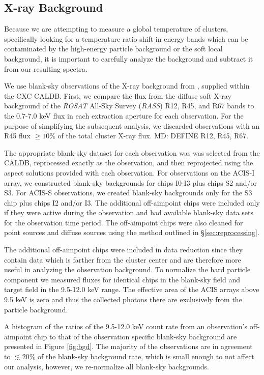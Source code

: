 \documentclass{emulateapj}
\begin{document}
\subsection{X-ray Background} \label{sec:background}

Because we are attempting to measure a global temperature of clusters,
specifically looking for a temperature ratio shift in energy bands
which can be contaminated by the high-energy particle
background or the soft local background, it is important to carefully
analyze the background and subtract it from our resulting spectra.

We use 
blank-sky observations of the X-ray background from
\cite{2001ApJ...562L.153M}, supplied within the CXC CALDB. 
First, we compare the flux from the diffuse soft X-ray
background of the {\textit{ROSAT}} All-Sky
Survey ({\textit{RASS}}) R12, R45, and R67 bands to the 0.7-7.0 keV flux in
each extraction aperture for each observation. For the purpose
of simplifying the subsequent analysis, we discarded observations with
an R45 flux $\geq 10\%$ of the total cluster X-ray flux. 
MD: DEFINE R12, R45, R67.

The appropriate blank-sky dataset for each observation was was
selected from the CALDB, reprocessed exactly as the
observation, and then reprojected using the aspect solutions provided
with each observation. For observations on the ACIS-I array, we
constructed blank-sky backgrounds for chips I0-I3 plus chips S2 and/or S3.
For ACIS-S observations, we created blank-sky backgrounds only for the S3
chip plus chips I2 and/or I3. The additional off-aimpoint chips were
included only if they were active during the observation and had
available blank-sky data sets for the observation time period. The
off-aimpoint chips were also cleaned for point sources and diffuse
sources using the method outlined in \S\ref{sec:reprocessing}.

The additional off-aimpoint chips were included in data reduction since
they contain data which is farther from the cluster center and are therefore
more useful in analyzing the observation background. To normalize the
hard particle component we measured fluxes for identical chips
in the blank-sky field and target field in the 9.5-12.0 keV
range. The effective area of the ACIS
arrays above 9.5 keV is zero and thus the collected photons there are
exclusively from the particle background.

A histogram of the ratios of the 9.5-12.0 keV count rate from an
observation's off-aimpoint chip to that of the observation specific
blank-sky background are presented in Figure \ref{fig:bgd}. The
majority of the observations are in agreement to $\lesssim 20\%$ of
the blank-sky background rate, which is small enough to not affect our
analysis, however, we re-normalize all blank-sky backgrounds. 
\end{document}
